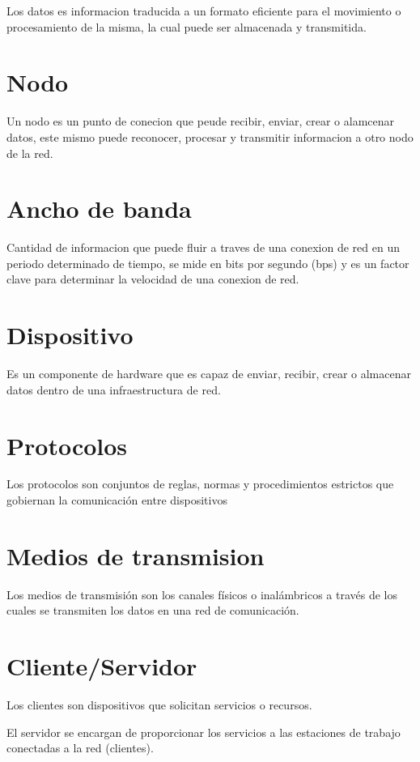 \documentclass[a4paper,12pt]{article}
\begin{document}
Los datos es informacion traducida a un formato eficiente para el movimiento o procesamiento de la misma, la cual puede ser almacenada y transmitida.

\section{Nodo}

Un nodo es un punto de conecion que peude recibir, enviar, crear o alamcenar datos, este mismo puede reconocer, procesar y transmitir informacion a otro nodo de la red.

\section{Ancho de banda}

Cantidad de informacion que puede fluir a traves de una conexion de red en un periodo determinado de tiempo, se mide en bits por segundo (bps) y es un factor clave para determinar la velocidad de una conexion de red.

\section{Dispositivo}

Es un componente de hardware que es capaz de enviar, recibir, crear o almacenar datos dentro de una infraestructura de red.

\section{Protocolos}

Los protocolos son conjuntos de reglas, normas y procedimientos estrictos que gobiernan la comunicación entre dispositivos

\section{Medios de transmision}
Los medios de transmisión son los canales físicos o inalámbricos a través de los cuales se transmiten los datos en una red de comunicación. 

\section{Cliente/Servidor}
Los clientes son dispositivos que solicitan servicios o recursos.

El servidor se encargan de proporcionar los servicios a las estaciones de trabajo conectadas a la red (clientes). 
\end{document}
